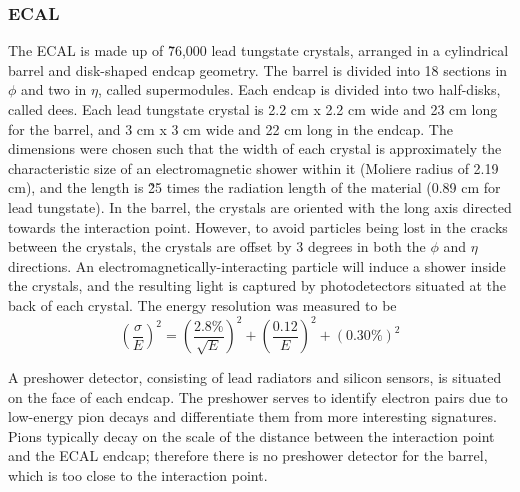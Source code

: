 \subsubsection{ECAL}
\label{exp:ECAL}
The ECAL is made up of \~76,000 lead tungstate crystals,
arranged in a cylindrical barrel and disk-shaped endcap geometry.  
The barrel is divided into 18 sections in $\phi$ and 
two in $\eta$, called supermodules.  
Each endcap is divided into two half-disks, called dees.  
Each lead tungstate crystal is 
2.2 cm x 2.2 cm wide and 23 cm long for the barrel, 
and 3 cm x 3 cm wide and 22 cm long in the endcap.  
The dimensions were chosen such that the width 
of each crystal is approximately the characteristic size of 
an electromagnetic shower within it 
(Moliere radius of 2.19 cm),
and the length is \~25 times the radiation length 
of the material (0.89 cm for lead tungstate).  
In the barrel, the crystals are oriented with the long axis
directed towards the interaction point.  
However, to avoid particles being lost in the cracks 
between the crystals,
the crystals are offset by 3 degrees in both the 
$\phi$ and $\eta$ directions.  
An electromagnetically-interacting particle will 
induce a shower inside the crystals, 
and the resulting light is captured by 
photodetectors situated at the back of each crystal.  
The energy resolution was measured to be 
\[
\left(\frac{\sigma}{E}\right)^2 = \left(\frac{2.8\%}{\sqrt{E}}\right)^2 + \left(\frac{0.12}{E}\right)^2 + \left(0.30\%\right)^2
\]

A preshower detector, consisting of lead radiators 
and silicon sensors, 
is situated on the face of each endcap.  
The preshower serves to identify electron pairs due to low-energy 
pion decays and differentiate them from more 
interesting signatures.  
Pions typically decay on the scale 
of the distance between the interaction point and the 
ECAL endcap;
therefore there is no preshower detector for the barrel, 
which is too close to the interaction point.  

